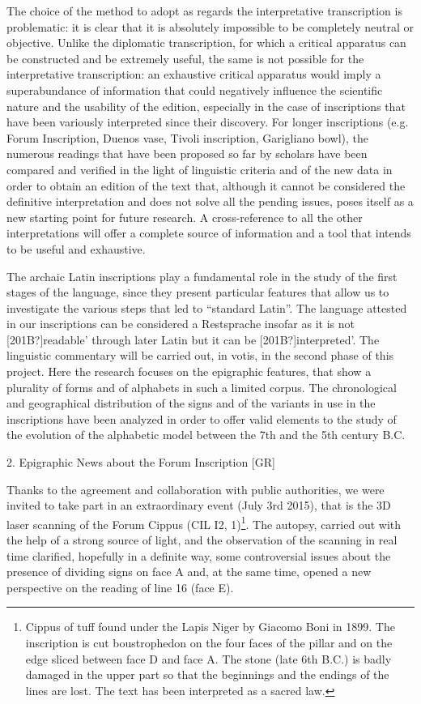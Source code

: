 \documentclass[amsthm,ebook]{saparticle}
\begin{document}
The choice of the method to adopt as regards the interpretative transcription is problematic: it is clear that it is
absolutely impossible to be completely neutral or objective. Unlike the diplomatic transcription, for which a critical
apparatus can be constructed and be extremely useful, the same is not possible for the interpretative transcription: an
exhaustive critical apparatus would imply a superabundance of information that could negatively influence the
scientific nature and the usability of the edition, especially in the case of inscriptions that have been variously
interpreted since their discovery. For longer inscriptions (e.g. Forum Inscription, Duenos vase, Tivoli inscription,
Garigliano bowl), the numerous readings that have been proposed so far by scholars have been compared and verified in
the light of linguistic criteria and of the new data in order to obtain an edition of the text that, although it cannot
be considered the definitive interpretation and does not solve all the pending issues, poses itself as a new starting
point for future research. A cross-reference to all the other interpretations will offer a complete source of
information and a tool that intends to be useful and exhaustive.

The archaic Latin inscriptions play a fundamental role in the study of the first stages of the language, since they
present particular features that allow us to investigate the various steps that led to “standard Latin”. The language
attested in our inscriptions can be considered a Restsprache insofar as it is not [201B?]readable’ through later Latin
but it can be [201B?]interpreted’. The linguistic commentary will be carried out, in votis, in the second phase of this
project. Here the research focuses on the epigraphic features, that show a plurality of forms and of alphabets in such
a limited corpus. The chronological and geographical distribution of the signs and of the variants in use in the
inscriptions have been analyzed in order to offer valid elements to the study of the evolution of the alphabetic model
between the 7th and the 5th century B.C.

2. Epigraphic News about the Forum Inscription [GR]

Thanks to the agreement and collaboration with public authorities, we were invited to take part in an extraordinary
event (July 3rd 2015), that is the 3D laser scanning of the Forum Cippus (CIL I2, 1)\footnote{Cippus of tuff found
under the Lapis Niger by Giacomo Boni in 1899. The inscription is cut boustrophedon on the four faces of the pillar and
on the edge sliced between face D and face A. The stone (late 6th B.C.) is badly damaged in the upper part so that the
beginnings and the endings of the lines are lost. The text has been interpreted as a sacred law.}. The autopsy, carried
out with the help of a strong source of light, and the observation of the scanning in real time clarified, hopefully in
a definite way, some controversial issues about the presence of dividing signs on face A and, at the same time, opened
a new perspective on the reading of line 16 (face E). 
\end{document}
